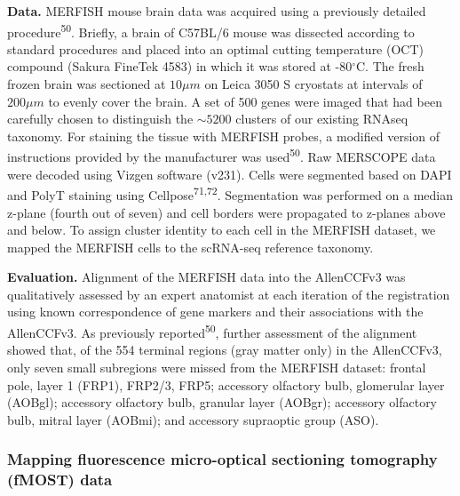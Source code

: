 \documentclass[
  12pt,
]{article}
\begin{document}
\textbf{Data.} MERFISH mouse brain data was acquired using a previously
detailed procedure\textsuperscript{50}. Briefly, a brain of C57BL/6
mouse was dissected according to standard procedures and placed into an
optimal cutting temperature (OCT) compound (Sakura FineTek 4583) in
which it was stored at -80\(^\circ\)C. The fresh frozen brain was
sectioned at \(10 \mu m\) on Leica 3050 S cryostats at intervals of
\(200 \mu m\) to evenly cover the brain. A set of 500 genes were imaged
that had been carefully chosen to distinguish the \({\sim}5200\)
clusters of our existing RNAseq taxonomy. For staining the tissue with
MERFISH probes, a modified version of instructions provided by the
manufacturer was used\textsuperscript{50}. Raw MERSCOPE data were
decoded using Vizgen software (v231). Cells were segmented based on DAPI
and PolyT staining using Cellpose\textsuperscript{71,72}. Segmentation
was performed on a median z-plane (fourth out of seven) and cell borders
were propagated to z-planes above and below. To assign cluster identity
to each cell in the MERFISH dataset, we mapped the MERFISH cells to the
scRNA-seq reference taxonomy.

\textbf{Evaluation.} Alignment of the MERFISH data into the AllenCCFv3
was qualitatively assessed by an expert anatomist at each iteration of
the registration using known correspondence of gene markers and their
associations with the AllenCCFv3. As previously
reported\textsuperscript{50}, further assessment of the alignment showed
that, of the 554 terminal regions (gray matter only) in the AllenCCFv3,
only seven small subregions were missed from the MERFISH dataset:
frontal pole, layer 1 (FRP1), FRP2/3, FRP5; accessory olfactory bulb,
glomerular layer (AOBgl); accessory olfactory bulb, granular layer
(AOBgr); accessory olfactory bulb, mitral layer (AOBmi); and accessory
supraoptic group (ASO).

\subsubsection{Mapping fluorescence micro-optical sectioning tomography
(fMOST)
data}\label{mapping-fluorescence-micro-optical-sectioning-tomography-fmost-data}
\end{document}
